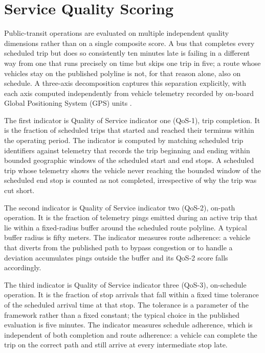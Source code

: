 \section{Service Quality Scoring}
\label{sec:foundations:qos}

Public-transit operations are evaluated on multiple independent quality
dimensions rather than on a single composite score. A bus that completes
every scheduled trip but does so consistently ten minutes late is failing
in a different way from one that runs precisely on time but skips one
trip in five; a route whose vehicles stay on the published polyline is
not, for that reason alone, also on schedule. A three-axis decomposition
captures this separation explicitly, with each axis computed
independently from vehicle telemetry recorded by on-board Global
Positioning System (GPS) units \cite{srisakaokul2023}.

The first indicator is Quality of Service indicator one (QoS-1), trip
completion. It is the fraction of scheduled trips that started and
reached their terminus within the operating period. The indicator is
computed by matching scheduled trip identifiers against telemetry that
records the trip beginning and ending within bounded geographic windows
of the scheduled start and end stops. A scheduled trip whose telemetry
shows the vehicle never reaching the bounded window of the scheduled end
stop is counted as not completed, irrespective of why the trip was cut
short.

The second indicator is Quality of Service indicator two (QoS-2),
on-path operation. It is the fraction of telemetry pings emitted during
an active trip that lie within a fixed-radius buffer around the
scheduled route polyline. A typical buffer radius is fifty meters. The
indicator measures route adherence: a vehicle that diverts from the
published path to bypass congestion or to handle a deviation accumulates
pings outside the buffer and its QoS-2 score falls accordingly.

The third indicator is Quality of Service indicator three (QoS-3),
on-schedule operation. It is the fraction of stop arrivals that fall
within a fixed time tolerance of the scheduled arrival time at that
stop. The tolerance is a parameter of the framework rather than a fixed
constant; the typical choice in the published evaluation is five
minutes. The indicator measures schedule adherence, which is independent
of both completion and route adherence: a vehicle can complete the trip
on the correct path and still arrive at every intermediate stop late.

